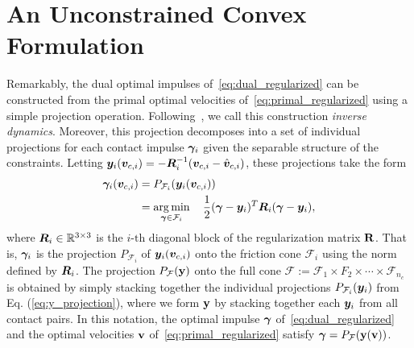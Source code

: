 \section{An Unconstrained Convex Formulation}
\label{sec:unconstrained_convex_formulation}
Remarkably,  the dual optimal impulses of~\eqref{eq:dual_regularized} can be constructed from 
the primal optimal velocities of~\eqref{eq:primal_regularized}
using a simple projection operation. 
 Following~\cite{bib:todorov2014}, we call this construction  \textit{inverse dynamics}. 
 Moreover, this projection
decomposes into a set of individual projections for each
contact impulse ${\bm\gamma}_i$ given the separable structure of the constraints.
Letting ${\bm{y}}_i({\bm{v}}_{c,i}) = -{\bm{R}}_i^{-1}({\bm{v}}_{c,i}-\hat{{\bm{v}}}_{c,i})$,
these projections take the form
\begin{equation}
  \begin{aligned}
	\bgamma_i(\vf{v}_{c,i})&= P_{\mathcal{F}_i}(\vf{y}_i(\vf{v}_{c,i}))\\
	&= \argmin_{\bgamma\in\mathcal{F}_i} \quad 
		\frac{1}{2}(\bgamma-\vf{y}_i)^T\vf{R}_i(\bgamma-\vf{y}_i),\\
	\end{aligned}
	\label{eq:y_projection}
\end{equation}
where ${\bm{R}}_i\in\mathbb{R}^{3\times3}$ is the $i\text{-th}$ diagonal block of
the regularization matrix ${\mathbf{R}}$. That is, ${\bm\gamma}_i$ is the projection
$P_{\mathcal{F}_i}$ of ${\bm{y}}_i({\bm{v}}_{c,i})$ onto the friction cone
$\mathcal{F}_i$ using the norm defined by ${\bm{R}}_i$.
The projection $P_{\mathcal{F}}({\mathbf{y}})$ onto 
the full cone $\mathcal{F} :=
\mathcal{F}_1 \times F_2 \times \cdots \times \mathcal{F}_{n_c}$ 
is obtained by simply stacking together the individual projections
$P_{\mathcal{F}_i}({\bm{y}}_i)$ from Eq. (\ref{eq:y_projection}),
where we form ${\mathbf{y}}$ by stacking together each
${\bm{y}}_i$ from all contact pairs.  In this notation,
the optimal impulse ${\bm\gamma}$ of~\eqref{eq:dual_regularized} 
and the optimal velocities ${\mathbf{v}}$ of~\eqref{eq:primal_regularized} 
satisfy  ${\bm\gamma} = P_{\mathcal{F}}({\mathbf{y}}({\mathbf{v}}))$.


